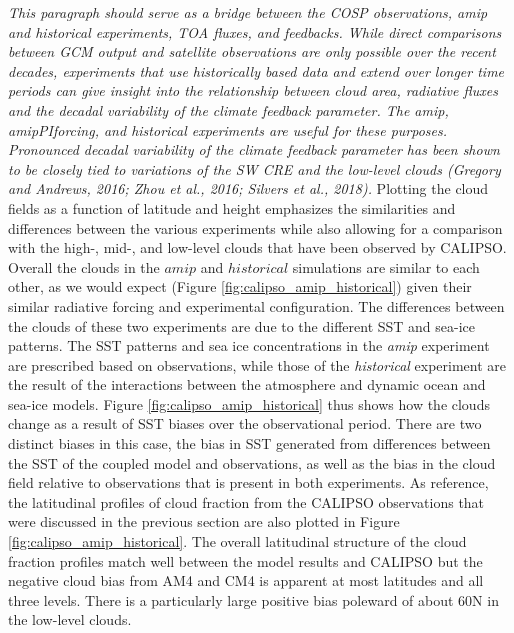 \documentclass[draft]{agujournal2019}
\begin{document}
\textit{This paragraph should serve as a bridge between the COSP observations, amip and historical experiments, TOA fluxes, and feedbacks.
While direct comparisons between GCM output and satellite observations are only possible over the recent decades, experiments that use
historically based data and extend over longer time periods can give insight into the relationship between cloud area, radiative fluxes
and the decadal variability of the climate feedback parameter.  The \textit{amip}, \textit{amipPIforcing}, and \textit{historical} experiments are useful
for these purposes.  Pronounced decadal variability of the climate feedback parameter has been shown to be closely tied to 
variations of the SW CRE and the low-level clouds (Gregory and Andrews, 2016; Zhou et al., 2016; Silvers et al., 2018).}
Plotting the cloud fields as a function of latitude and height emphasizes the similarities and differences 
between the various experiments while also allowing for a comparison with the high-, mid-, and low-level clouds 
that have been observed by CALIPSO.  Overall the clouds in the $amip$ and $historical$ simulations are similar to 
each other, as we would expect (Figure \ref{fig:calipso_amip_historical}) given their similar radiative forcing 
and experimental configuration.  The differences between the clouds of 
these two experiments are due to the different SST and sea-ice patterns.  The SST patterns and 
sea ice concentrations in the \textit{amip} experiment are
prescribed based on observations, while those of the \textit{historical} experiment are the result of the 
interactions between the atmosphere and dynamic ocean and sea-ice models.  
Figure \ref{fig:calipso_amip_historical} thus shows how the clouds change 
as a result of SST biases over the observational period.   There are two distinct biases in this case, 
the bias in SST generated from differences between the SST of the coupled model and observations,
as well as the bias in the cloud field relative to observations that is present in both 
experiments.  As reference, the latitudinal profiles of cloud fraction from the CALIPSO observations that 
were discussed in the previous section are also plotted in  Figure \ref{fig:calipso_amip_historical}.
The overall latitudinal structure of the cloud fraction profiles match well between the model results and 
CALIPSO but the negative cloud bias from AM4 and CM4 is apparent at most latitudes and all three levels.  
There is a particularly large positive bias poleward of about 60N in the low-level clouds. 
\end{document}
